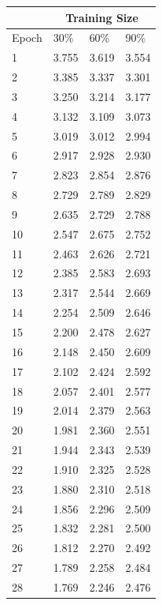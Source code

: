 \documentclass[12pt]{article}
\begin{document}
\begin{center}
          \tiny
          \begin{tabular}{|l || l| l| l|}
            \hline
            &\multicolumn{3}{|c|}{Training Size} \\
            \hline
            Epoch & 30\% & 60\% & 90\% \\
            \hline
            1 & 3.755 & 3.619 & 3.554 \\
            2 & 3.385 & 3.337 & 3.301 \\
            3 & 3.250 & 3.214 & 3.177 \\
            4 & 3.132 & 3.109 & 3.073 \\
            5 & 3.019 & 3.012 & 2.994 \\
            6 & 2.917 & 2.928 & 2.930 \\
            7 & 2.823 & 2.854 & 2.876 \\
            8 & 2.729 & 2.789 & 2.829 \\
            9 & 2.635 & 2.729 & 2.788 \\
            10 & 2.547 & 2.675 & 2.752 \\
            11 & 2.463 & 2.626 & 2.721 \\
            12 & 2.385 & 2.583 & 2.693 \\
            13 & 2.317 & 2.544 & 2.669 \\
            14 & 2.254 & 2.509 & 2.646 \\
            15 & 2.200 & 2.478 & 2.627 \\
            16 & 2.148 & 2.450 & 2.609 \\
            17 & 2.102 & 2.424 & 2.592 \\
            18 & 2.057 & 2.401 & 2.577 \\
            19 & 2.014 & 2.379 & 2.563 \\
            20 & 1.981 & 2.360 & 2.551 \\
            21 & 1.944 & 2.343 & 2.539 \\
            22 & 1.910 & 2.325 & 2.528 \\
            23 & 1.880 & 2.310 & 2.518 \\
            24 & 1.856 & 2.296 & 2.509 \\
            25 & 1.832 & 2.281 & 2.500 \\
            26 & 1.812 & 2.270 & 2.492 \\
            27 & 1.789 & 2.258 & 2.484 \\
            28 & 1.769 & 2.246 & 2.476 \\

\end{tabular}
\end{center}
\end{document}
